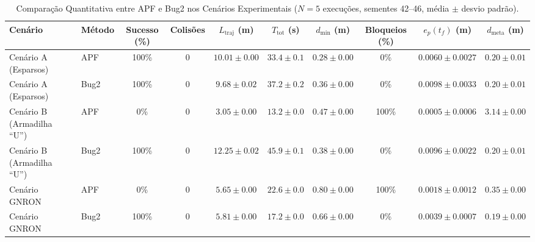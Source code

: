 \begin{table}[t]
\centering
\caption{Comparação Quantitativa entre APF e Bug2 nos Cenários Experimentais ($N = 5$ execuções, sementes 42--46, média $\pm$ desvio padrão).}
\label{tab:comparacao_p6}
\setlength{\tabcolsep}{5pt}
\begin{tabular}{llcccccccc}
\hline
\textbf{Cenário} & \textbf{Método} & \textbf{Sucesso (\%)} & \textbf{Colisões} & \textbf{$L_{\text{traj}}$ (m)} & \textbf{$T_{\text{tot}}$ (s)} & \textbf{$d_{\min}$ (m)} & \textbf{Bloqueios (\%)} & \textbf{$e_p(t_f)$ (m)} & \textbf{$d_{\text{meta}}$ (m)} \\
\hline
Cenário A (Esparsos) & APF & 100\% & 0 & $10.01 \pm 0.00$ & $33.4 \pm 0.1$ & $0.28 \pm 0.00$ & 0\% & $0.0060 \pm 0.0027$ & $0.20 \pm 0.01$ \\
Cenário A (Esparsos) & Bug2 & 100\% & 0 & $9.68 \pm 0.02$ & $37.2 \pm 0.2$ & $0.36 \pm 0.00$ & 0\% & $0.0098 \pm 0.0033$ & $0.20 \pm 0.01$ \\
Cenário B (Armadilha ``U'') & APF & 0\% & 0 & $3.05 \pm 0.00$ & $13.2 \pm 0.0$ & $0.47 \pm 0.00$ & 100\% & $0.0005 \pm 0.0006$ & $3.14 \pm 0.00$ \\
Cenário B (Armadilha ``U'') & Bug2 & 100\% & 0 & $12.25 \pm 0.02$ & $45.9 \pm 0.1$ & $0.38 \pm 0.00$ & 0\% & $0.0096 \pm 0.0022$ & $0.20 \pm 0.01$ \\
Cenário GNRON & APF & 0\% & 0 & $5.65 \pm 0.00$ & $22.6 \pm 0.0$ & $0.80 \pm 0.00$ & 100\% & $0.0018 \pm 0.0012$ & $0.35 \pm 0.00$ \\
Cenário GNRON & Bug2 & 100\% & 0 & $5.81 \pm 0.00$ & $17.2 \pm 0.0$ & $0.66 \pm 0.00$ & 0\% & $0.0039 \pm 0.0007$ & $0.19 \pm 0.00$ \\
\hline
\end{tabular}
\end{table}
